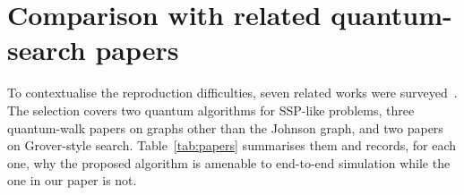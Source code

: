 \documentclass[11pt,a4paper]{article}
\begin{document}
\section{Comparison with related quantum-search papers}
\label{sec:compare}

To contextualise the reproduction difficulties, seven related
works were surveyed~\cite{zheng2022,sato2024,perriello2021,razzoli2024,dasilva2024,portugal2025,wingbocanegra2025}.
The selection covers two quantum algorithms for SSP-like problems,
three quantum-walk papers on graphs other than the Johnson graph,
and two papers on Grover-style search.
Table~\ref{tab:papers} summarises them and records, for each one,
why the proposed algorithm is amenable to end-to-end simulation
while the one in our paper is not.
\end{document}
